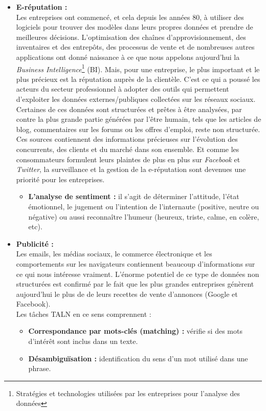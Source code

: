 \begin{itemize}[leftmargin={0.5cm}]
    \item \textbf{E-réputation :}\\
    Les entreprises ont commencé, et cela depuis les années 80, à utiliser des logiciels pour trouver des modèles dans leurs propres données et prendre de meilleures décisions. L'optimisation des chaînes d'approvisionnement, des inventaires et des entrepôts, des processus de vente et de nombreuses autres applications ont donné naissance à ce que nous appelons aujourd'hui la \emph{Business Intelligence}\footnote{Stratégies et technologies utilisées par les entreprises pour l'analyse des données} (BI). Mais, pour une entreprise, le plus important et le plus précieux est la réputation auprès de la clientèle. C'est ce qui a poussé les acteurs du secteur professionnel à adopter des outils qui permettent d'exploiter les données externes/publiques collectées sur les réseaux sociaux.\\
    Certaines de ces données sont structurées et prêtes à être analysées, par contre la plus grande partie générées par l'être humain, tels que les articles de blog, commentaires sur les forums ou les offres d'emploi, reste non structurée. Ces sources contiennent des informations précieuses sur l'évolution des concurrents, des clients et du marché dans son ensemble. Et comme les consommateurs formulent leurs plaintes de plus en plus sur \emph{Facebook} et \emph{Twitter}, la surveillance et la gestion de la e-réputation sont devenues une priorité pour les entreprises.
    \begin{itemize}
        \item \textbf{L'analyse de sentiment :} il s'agit de déterminer l'attitude, l'état émotionnel, le jugement ou l'intention de l'internaute (positive, neutre ou négative) ou aussi reconnaître l'humeur (heureux, triste, calme, en colère, etc).\\
    \end{itemize}

    \item \textbf{Publicité :}\\
    Les emails, les médias sociaux, le commerce électronique et les comportements sur les navigateurs contiennent beaucoup d'informations sur ce qui nous intéresse vraiment. L'énorme potentiel de ce type de données non structurées est confirmé par le fait que les plus grandes entreprises génèrent aujourd'hui le plus de de leurs recettes de vente d'annonces (Google et Facebook).\\ Les tâches TALN en ce sens comprennent :
    \begin{itemize}
        \item \textbf{Correspondance par mots-clés (matching) :} vérifie si des mots d'intérêt sont inclus dans un texte. 
        \item \textbf{Désambiguïsation :} identification du sens d'un mot utilisé dans une phrase.
    \end{itemize}
\end{itemize}

